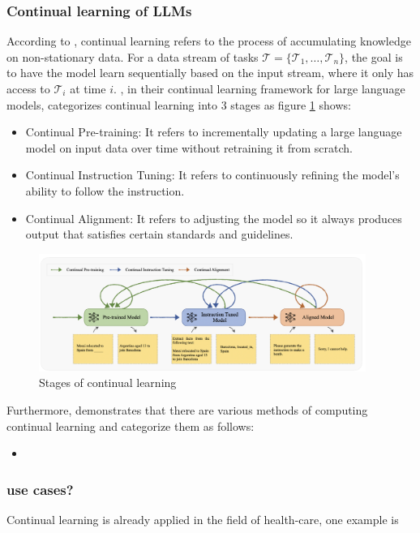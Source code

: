 \documentclass[runningheads]{llncs}
\begin{document}
\subsubsection{Continual learning of LLMs} 
\noindent \newline
According to \cite{Biesi20}, continual learning refers to the process of accumulating knowledge on non-stationary data. For a data stream of tasks $\mathcal{T}= \{\mathcal{T}_1,\ldots,\mathcal{T}_n \}$, the goal is to
have the model learn sequentially based on the input stream, where it only has access to $\mathcal{T}_i$ at time $i$. \cite{Wu24}, in their continual learning framework for large language models, categorizes 
continual learning into 3 stages as figure \ref{fig:acl_stages} shows:
\begin{itemize}
  \item Continual Pre-training: It refers to incrementally updating a large language model on input data over time without retraining it from scratch. 
  \item Continual Instruction Tuning: It refers to continuously refining the model's ability to follow the instruction.
  \item Continual Alignment: It refers to adjusting the model so it always produces output that satisfies certain standards and guidelines.
\end{itemize}
\begin{figure}[htbp]
  \centering
  \includegraphics[width=0.95\textwidth]{CL stages.png}
  \caption{Stages of continual learning \cite{Wu24}}
  \label{fig:acl_stages}
\end{figure}
Furthermore, \cite{Biesi20} demonstrates that there are various methods of computing continual learning and categorize them as follows:
\begin{itemize}
  \item 
\end{itemize}

\subsubsection{use cases?}
\noindent \newline
Continual learning is already applied in the field of health-care, one example is 
\end{document}

